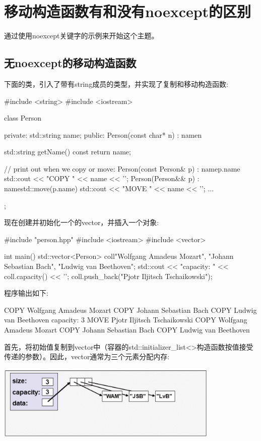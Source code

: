 \section{移动构造函数有和没有noexcept的区别}
通过使用noexcept关键字的示例来开始这个主题。

\subsection{无noexcept的移动构造函数}

下面的类，引入了带有string成员的类型，并实现了复制和移动构造函数:

\begin{cppcode}
#include <string>
#include <iostream>

class Person {
	private:
	std::string name;
	public:
	Person(const char* n)
	: name{n} {
	}

	std::string getName() const {
		return name;
	}

	// print out when we copy or move:
	Person(const Person& p)
	: name{p.name} {
		std::cout << "COPY " << name << '\n';
	}
	Person(Person&& p)
	: name{std::move(p.name)} {
		std::cout << "MOVE " << name << '\n';
	}
	...
};
\end{cppcode}

现在创建并初始化一个的vector，并插入一个对象:

\begin{cppcode}
#include "person.hpp"
#include <iostream>
#include <vector>

int main()
{
	std::vector<Person> coll{"Wolfgang Amadeus Mozart",
		"Johann Sebastian Bach",
		"Ludwig van Beethoven"};
	std::cout << "capacity: " << coll.capacity() << '\n';
	coll.push_back("Pjotr Iljitsch Tschaikowski");
}
\end{cppcode}

程序输出如下:

\begin{outputcode}
COPY Wolfgang Amadeus Mozart
COPY Johann Sebastian Bach
COPY Ludwig van Beethoven
capacity: 3
MOVE Pjotr Iljitsch Tschaikowski
COPY Wolfgang Amadeus Mozart
COPY Johann Sebastian Bach
COPY Ludwig van Beethoven
\end{outputcode}

首先，将初始值复制到vector中（容器的std::initializer_list<>构造函数按值接受传递的参数）。因此，vector通常为三个元素分配内存:

\begin{center}
	\includegraphics[width=0.8\textwidth]{part1/ch7/images/1}
\end{center}

